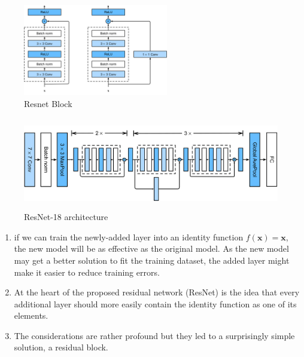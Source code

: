 \begin{table}[H]
    \begin{minipage}[b]{0.4\linewidth}
        \begin{figure}[H]
            \centering
            \includegraphics[width=\linewidth, height=4cm, keepaspectratio]{Pictures/convolutional-neural-network/resnet-block.jpg}
            \caption{Resnet Block}
        \end{figure}
    \end{minipage}
    \hfill
    \begin{minipage}[b]{0.55\linewidth}
        \begin{figure}[H]
            \centering
            \includegraphics[width=\linewidth, height=4cm, keepaspectratio]{Pictures/convolutional-neural-network/resnet18-90.jpg}
            \caption{ResNet-18 architecture}
        \end{figure}
    \end{minipage}
\end{table}

\begin{enumerate}
    \item if we can train the newly-added layer into an identity function $f(\mathbf{x}) = \mathbf{x}$, the new model will be as effective as the original model. As the new model may get a better solution to fit the training dataset, the added layer might make it easier to reduce training errors.

    \item At the heart of the proposed residual network (ResNet) is the idea that every additional layer should more easily contain the identity function as one of its elements. 
    
    \item The considerations are rather profound but they led to a surprisingly simple solution, a residual block.

    
\end{enumerate}



